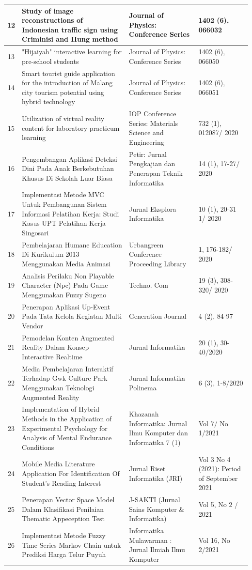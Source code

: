 {\begin{longtable}{|c|p{5.5cm}|p{5cm}|p{3cm}|}
\hline
12 & Study of image reconstructions of Indonesian traffic sign using Criminisi and Hung method & Journal of Physics: Conference Series & 1402 (6), 066032 \\
\hline
13 & "Hijaiyah" interactive learning for pre-school students & Journal of Physics: Conference Series & 1402 (6), 066050 \\
\hline
14 & Smart tourist guide application for the introduction of Malang city tourism potential using hybrid technology & Journal of Physics: Conference Series & 1402 (6), 066051 \\
\hline
15 & Utilization of virtual reality content for laboratory practicum learning & IOP Conference Series: Materials Science and Engineering & 732 (1), 012087/ 2020 \\
\hline
16 & Pengembangan Aplikasi Deteksi Dini Pada Anak Berkebutuhan Khusus Di Sekolah Luar Biasa & Petir: Jurnal Pengkajian dan Penerapan Teknik Informatika & 14 (1), 17-27/ 2020 \\
\hline
17 & Implementasi Metode MVC Untuk Pembangunan Sistem Informasi Pelatihan Kerja: Studi Kasus UPT Pelatihan Kerja Singosari & Jurnal Eksplora Informatika & 10 (1), 20-31 1/ 2020 \\
\hline
18 & Pembelajaran Humane Education Di Kurikulum 2013 Menggunakan Media Animasi & Urbangreen Conference Proceeding Library & 1, 176-182/ 2020 \\
\hline
19 & Analisis Perilaku Non Playable Character (Npc) Pada Game Menggunakan Fuzzy Sugeno & Techno. Com & 19 (3), 308-320/ 2020 \\
\hline
20 & Penerapan Aplikasi Up-Event Pada Tata Kelola Kegiatan Multi Vendor & Generation Journal & 4 (2), 84-97 \\
\hline
21 & Pemodelan Konten Augmented Reality Dalam Konsep Interactive Realtime & Jurnal Informatika & 20 (1), 30-40/2020 \\
\hline
22 & Media Pembelajaran Interaktif Terhadap Gwk Culture Park Menggunakan Teknologi Augmented Reality & Jurnal Informatika Polinema & 6 (3), 1-8/2020 \\
\hline
23 & Implementation of Hybrid Methods in the Application of Experimental Psychology for Analysis of Mental Endurance Conditions & Khazanah Informatika: Jurnal Ilmu Komputer dan Informatika 7 (1) & Vol 7/ No 1/2021 \\
\hline
24 & Mobile Media Literature Application For Identification Of Student's Reading Interest & Jurnal Riset Informatika (JRI) & Vol 3 No 4 (2021): Period of September 2021 \\
\hline
25 & Penerapan Vector Space Model Dalam Klasifikasi Penilaian Thematic Appeception Test & J-SAKTI (Jurnal Sains Komputer \& Informatika) & Vol 5, No 2 / 2021 \\
\hline
26 & Implementasi Metode Fuzzy Time Series Markov Chain untuk Prediksi Harga Telur Puyuh & Informatika Mulawarman : Jurnal Ilmiah Ilmu Komputer & Vol 16, No 2/2021 \\
\hline
\end{longtable}
}

